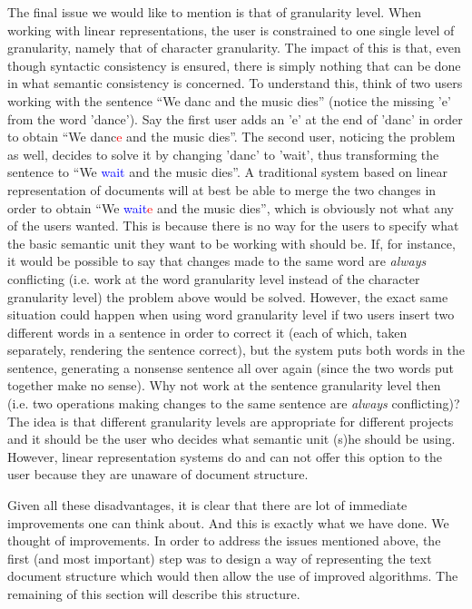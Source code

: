 The final issue we would like to mention is that of granularity level. When working with
linear representations, the user is constrained to one single level of granularity, namely
that of character granularity. The impact of this is that, even though syntactic consistency
is ensured, there is simply nothing that can be done in what semantic consistency is concerned. To
understand this, think of two users working with the sentence ``We danc and the music
dies'' (notice the missing 'e' from the word 'dance'). Say the first user adds an 'e'
at the end of 'danc' in order to obtain ``We danc\textcolor{red}{e} and the music dies''.
The second user, noticing the problem as well, decides to solve it by changing 'danc'
to 'wait', thus transforming the sentence to ``We \textcolor{blue}{wait} and the music dies''. A traditional
system based on linear representation of documents will at best be able to merge the
two changes in order to obtain ``We \textcolor{blue}{wait}\textcolor{red}{e} and the music dies'', which
is obviously not what any of the users wanted. This is because there is no way for
the users to specify what the basic semantic unit they want to be working with should be. If, for instance, it
would be possible to say that changes made to the same word are \emph{always} conflicting
(i.e. work at the word granularity level instead of the character granularity level)
the problem above would be solved. However, the exact same situation could happen
when using word granularity level if two users insert two different words in a sentence
in order to correct it (each of which, taken separately, rendering the sentence correct),
but the system puts both words in the sentence, generating a nonsense sentence
all over again (since the two words put together make no sense). Why not work at the
sentence granularity level then (i.e. two operations making changes to the same sentence
are \emph{always} conflicting)? The idea is that different granularity levels are appropriate
for different projects and it should be the user who decides what semantic unit (s)he
should be using. However, linear representation systems do and can not offer this option
to the user because they are unaware of document structure.

Given all these disadvantages, it is clear that there are lot of immediate improvements
one can think about. And this is exactly what we have done. We thought of improvements.
In order to address the issues mentioned above, the first (and most important) step
was to design a way of representing the text document structure which would then allow
the use of improved algorithms. The remaining of this section will describe this structure.

